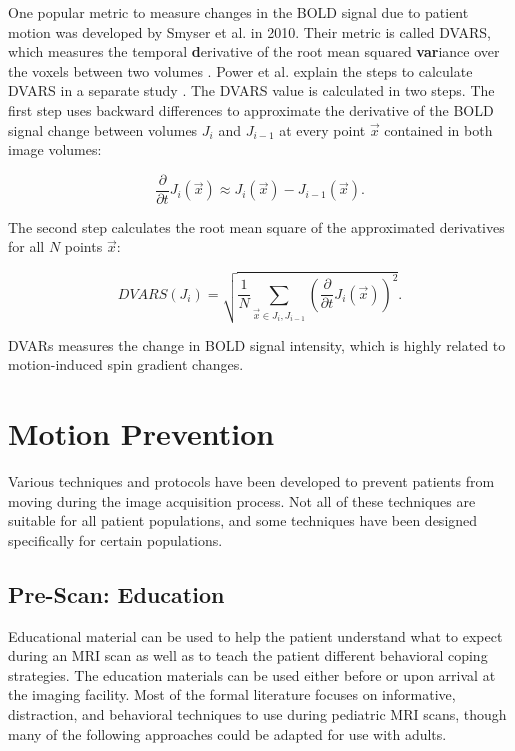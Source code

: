 One popular metric to measure changes in the BOLD signal due to patient motion was developed by Smyser et al. in 2010. Their metric is called DVARS, which measures the temporal \textbf{d}erivative of the root mean squared \textbf{var}iance over the voxels between two volumes \cite{Smyser2010}. Power et al. explain the steps to calculate DVARS in a separate study \cite{Power2012}. The DVARS value is calculated in two steps. The first step uses backward differences to approximate the derivative of the BOLD signal change between volumes $J_i$ and $J_{i-1}$ at every point $\vec{x}$ contained in both image volumes:

\begin{equation}
\frac{\partial}{\partial t} J_i(\vec{x}) \approx J_i(\vec{x}) - J_{i-1}(\vec{x}).
\end{equation}


The second step calculates the root mean square of the approximated derivatives for all $N$ points $\vec{x}$:

\begin{equation}
DVARS(J_i) = \sqrt{ \frac{1}{N} \sum_{\vec{x} \in J_i, J_{i-1}} \left( \frac{\partial}{\partial t} J_i(\vec{x}) \right)^2 }.
\end{equation}

DVARs measures the change in BOLD signal intensity, which is highly related to motion-induced spin gradient changes. 

\section{Motion Prevention}

Various techniques and protocols have been developed to prevent patients from moving during the image acquisition process. Not all of these techniques are suitable for all patient populations, and some techniques have been designed specifically for certain populations.

\subsection{Pre-Scan: Education}

Educational material can be used to help the patient understand what to expect during an MRI scan as well as to teach the patient different behavioral coping strategies. The education materials can be used either before or upon arrival at the imaging facility. Most of the formal literature focuses on informative, distraction, and behavioral techniques to use during pediatric MRI scans, though many of the following approaches could be adapted for use with adults.


